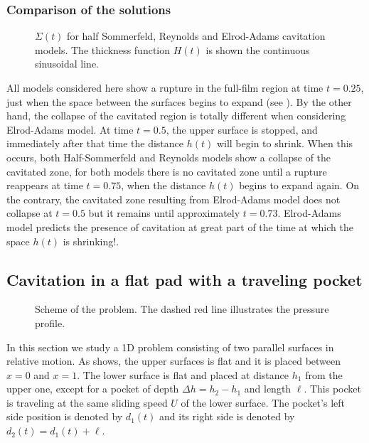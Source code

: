 \subsubsection*{Comparison of the solutions}
\begin{figure}[ht]
\centering 
\def\svgwidth{\textwidth}\footnotesize{
}
\caption[Comparison of cavitation models for a Pure Squeeze problem]{$\Sigma(t)$ for half Sommerfeld, Reynolds and Elrod-Adams cavitation models. The thickness function $H(t)$ is shown the continuous sinusoidal line.}\label{fig:squeeze_models_comparison}
\end{figure}
All models considered here show a rupture in the full-film region at time $t=0.25$, just when the space between the surfaces begins to expand (see ). By the other hand, the collapse of the cavitated region is totally different when considering Elrod-Adams model. At time $t=0.5$, the upper surface is stopped, and immediately after that time the distance $h(t)$ will begin to shrink. When this occurs, both Half-Sommerfeld and Reynolds models show a collapse of the cavitated zone, for both models there is no cavitated zone until a rupture reappears at time $t=0.75$, when the distance $h(t)$ begins to expand again. On the contrary, the cavitated zone resulting from Elrod-Adams model does not collapse at $t=0.5$ but it remains until approximately $t=0.73$. Elrod-Adams model predicts the presence of cavitation at great part of the time at which the space $h(t)$ is shrinking!.
\newpage
\subsection{Cavitation in a flat pad with a traveling pocket}\label{sec:ex_sol_stepped_shapes}
\begin{figure}[ht!]
 \centering 
 \def\svgwidth{\textwidth}	
\caption[Scheme of the rectangular wedges problem]{Scheme of the problem. The dashed red line illustrates the pressure profile.}\label{fig:scheme1}
\end{figure}
In this section we study a 1D problem consisting of two parallel surfaces in relative motion. As  shows, the upper surfaces is flat and it is placed between $x=0$ and $x=1$. The lower surface is flat and placed at distance $h_1$ from the upper one, except for a pocket of depth $\Delta h=h_2-h_1$ and length $\ell$. This pocket is traveling at the same sliding speed $U$ of the lower surface. The pocket's left side position is denoted by $d_1(t)$ and its right side is denoted by $d_2(t)=d_1(t)+\ell$.


